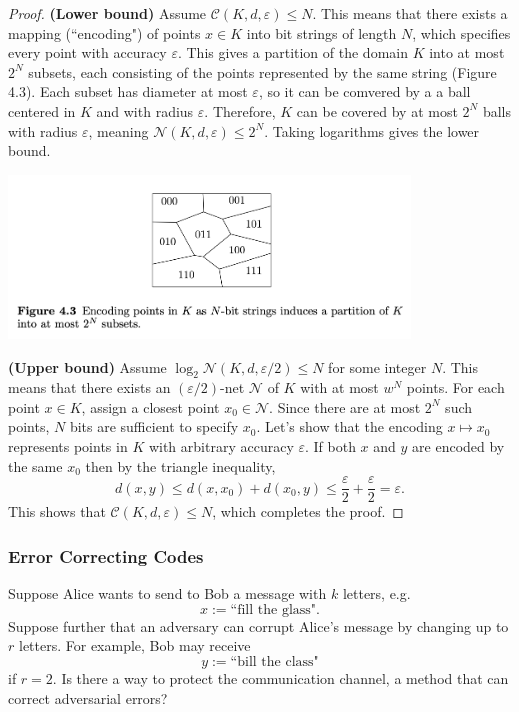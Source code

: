 \begin{proof}
\textbf{(Lower bound)} Assume $\mathcal{C}(K, d, \varepsilon) \leq N$. This means that there exists a mapping 
(``encoding") of points $x \in K$ into bit strings of length $N$, which specifies every point with accuracy 
$\varepsilon$. This gives a partition of the domain $K$ into at most $2^N$ subsets, each consisting of the 
points represented by the same string (Figure 4.3). Each subset has diameter at most $\varepsilon$, so it can be 
comvered by a a ball centered in $K$ and with radius $\varepsilon$. Therefore, $K$ can be covered by at most 
$2^N$ balls with radius $\varepsilon$, meaning $\mathcal{N}(K, d, \varepsilon) \leq 2^N$. Taking logarithms 
gives the lower bound.

\begin{center}
    \includegraphics[width=0.8\textwidth]{Chapter 4/fig4-3.png}
\end{center}

\textbf{(Upper bound)} Assume $\log_{2}{\mathcal{N}(K, d, \varepsilon/2)} \leq N$ for some integer $N$. This 
means that there exists an $(\varepsilon/2)$-net $\mathcal{N}$ of $K$ with at most $w^N$ points. For each point 
$x \in K$, assign a closest point $x_0 \in \mathcal{N}$. Since there are at most $2^N$ such points, $N$ bits are 
sufficient to specify $x_0$. Let's show that the encoding $x \mapsto x_0$ represents points in $K$ with 
arbitrary accuracy $\varepsilon$. If both $x$ and $y$ are encoded by the same $x_0$ then by the triangle 
inequality, 
\[ d(x, y) \leq d(x, x_0) + d(x_0, y) \leq \frac{\varepsilon}{2} + \frac{\varepsilon}{2} = \varepsilon. \]
This shows that $\mathcal{C}(K, d, \varepsilon) \leq N$, which completes the proof.
\end{proof}


\subsubsection{Error Correcting Codes}
Suppose Alice wants to send to Bob a message with $k$ letters, e.g.
\[ x := \text{``fill the glass"}. \]
Suppose further that an adversary can corrupt Alice's message by changing up to $r$ letters. For example, Bob 
may receive 
\[ y := \text{``bill the class"} \]
if $r = 2$. Is there a way to protect the communication channel, a method that can correct adversarial errors?


